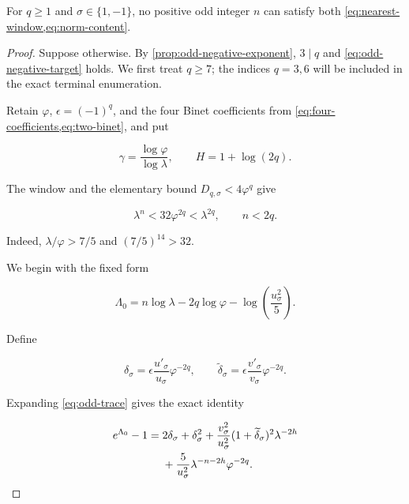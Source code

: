\begin{theorem}
\label{thm:odd-exclusion}
For $q\geqslant1$ and $\sigma\in\{1,-1\}$, no positive odd integer $n$
can satisfy both \cref{eq:nearest-window,eq:norm-content}.
\end{theorem}

\begin{proof}
Suppose otherwise. By \cref{prop:odd-negative-exponent}, $3\mid q$ and
\cref{eq:odd-negative-target} holds. We first treat $q\geqslant7$; the
indices $q=3,6$ will be included in the exact terminal enumeration.

Retain $\varphi$, $\epsilon=(-1)^q$, and the four Binet coefficients from
\cref{eq:four-coefficients,eq:two-binet}, and put

\begin{equation}
 \gamma=\frac{\log\varphi}{\log\lambda},
 \qquad
 H=1+\log(2q).
 \label{eq:odd-gamma-H}
\end{equation}

The window and the elementary bound $D_{q,\sigma}<4\varphi^q$ give

\begin{equation}
 \lambda^n<32\varphi^{2q}<\lambda^{2q},
 \qquad
 n<2q.
 \label{eq:odd-n-less-2q}
\end{equation}

Indeed, $\lambda/\varphi>7/5$ and $(7/5)^{14}>32$.

We begin with the fixed form

\begin{equation}
 \Lambda_0
 =n\log\lambda-2q\log\varphi
 -\log\left(\frac{u_\sigma^2}{5}\right).
 \label{eq:odd-Lambda0}
\end{equation}

Define

\begin{equation}
 \delta_\sigma
 =\epsilon\frac{u'_\sigma}{u_\sigma}\varphi^{-2q},
 \qquad
 \widetilde\delta_\sigma
 =\epsilon\frac{v'_\sigma}{v_\sigma}\varphi^{-2q}.
\end{equation}

Expanding \cref{eq:odd-trace} gives the exact identity

\begin{align}
 e^{\Lambda_0}-1={}&
 2\delta_\sigma+\delta_\sigma^2
 +\frac{v_\sigma^2}{u_\sigma^2}
 (1+\widetilde\delta_\sigma)^2\lambda^{-2h}\notag\\
 &+\frac5{u_\sigma^2}
 \lambda^{-n-2h}\varphi^{-2q}.
 \label{eq:odd-fixed-expansion}
\end{align}


\end{proof}
